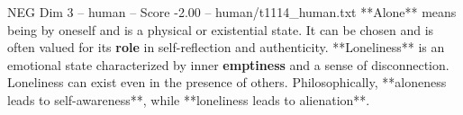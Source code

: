\begin{textsample}{NEG Dim 3 – human – Score -2.00 – human/t1114\_human.txt}  \label{ex:f3_neg_035}
**Alone** means being by oneself and is a physical or existential state.
It can be chosen and is often valued for its \textbf{role} in self-reflection and authenticity. **Loneliness** is an emotional state characterized by inner \textbf{emptiness} and a sense of disconnection.
Loneliness can exist even in the presence of others.
Philosophically, **aloneness leads to self-awareness**, while **loneliness leads to alienation**.

\end{textsample}
